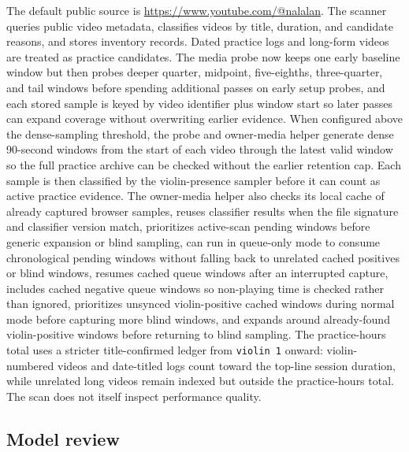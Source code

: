 \documentclass[12pt,letterpaper]{article}
\begin{document}
The default public source is \url{https://www.youtube.com/@nalalan}. The scanner queries public video metadata, classifies videos by title, duration, and candidate reasons, and stores inventory records. Dated practice logs and long-form videos are treated as practice candidates. The media probe now keeps one early baseline window but then probes deeper quarter, midpoint, five-eighths, three-quarter, and tail windows before spending additional passes on early setup probes, and each stored sample is keyed by video identifier plus window start so later passes can expand coverage without overwriting earlier evidence. When configured above the dense-sampling threshold, the probe and owner-media helper generate dense 90-second windows from the start of each video through the latest valid window so the full practice archive can be checked without the earlier retention cap. Each sample is then classified by the violin-presence sampler before it can count as active practice evidence. The owner-media helper also checks its local cache of already captured browser samples, reuses classifier results when the file signature and classifier version match, prioritizes active-scan pending windows before generic expansion or blind sampling, can run in queue-only mode to consume chronological pending windows without falling back to unrelated cached positives or blind windows, resumes cached queue windows after an interrupted capture, includes cached negative queue windows so non-playing time is checked rather than ignored, prioritizes unsynced violin-positive cached windows during normal mode before capturing more blind windows, and expands around already-found violin-positive windows before returning to blind sampling. The practice-hours total uses a stricter title-confirmed ledger from \texttt{violin 1} onward: violin-numbered videos and date-titled logs count toward the top-line session duration, while unrelated long videos remain indexed but outside the practice-hours total. The scan does not itself inspect performance quality.

\subsection*{Model review}
\end{document}

